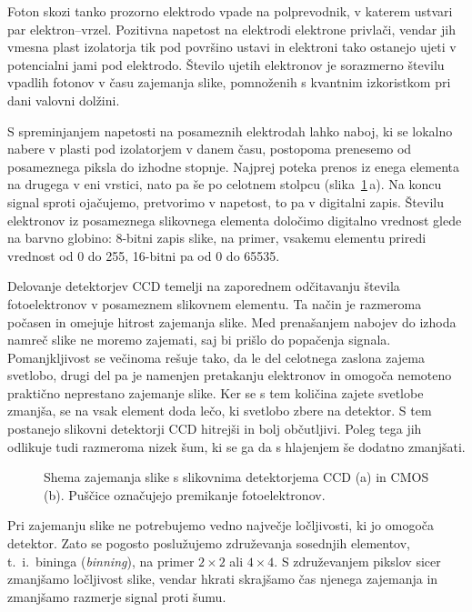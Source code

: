 Foton skozi tanko prozorno elektrodo vpade na polprevodnik, v katerem ustvari
par elektron--vrzel. Pozitivna napetost na elektrodi elektrone privlači, vendar jih 
vmesna plast izolatorja tik pod površino ustavi in elektroni tako ostanejo ujeti v potencialni jami
pod elektrodo. Število ujetih elektronov je sorazmerno številu vpadlih fotonov v času zajemanja slike, 
pomnoženih s kvantnim izkoristkom pri dani valovni dolžini. 

S spreminjanjem napetosti na posameznih elektrodah lahko naboj, ki se lokalno nabere 
v plasti pod izolatorjem v danem času, postopoma prenesemo od posameznega 
piksla do izhodne stopnje. Najprej poteka prenos iz enega elementa na drugega v eni vrstici, 
nato pa še po celotnem stolpcu (slika~\ref{11_CCD}\,a). Na koncu signal sproti ojačujemo, 
pretvorimo v napetost, to pa v digitalni zapis. Številu elektronov iz posameznega
slikovnega elementa določimo digitalno vrednost glede na barvno globino: 8-bitni zapis slike, 
na primer, vsakemu elementu priredi vrednost od 0 do 255, 16-bitni pa od 0 do 65535.

Delovanje detektorjev CCD temelji na zaporednem odčitavanju števila fotoelektronov v posameznem 
slikovnem elementu. Ta način je razmeroma počasen in omejuje hitrost zajemanja slike. Med 
prenašanjem nabojev do izhoda namreč slike ne moremo zajemati, saj bi prišlo do popačenja signala. 
Pomanjkljivost se večinoma rešuje tako, da le del celotnega zaslona zajema svetlobo, drugi del
pa je namenjen pretakanju elektronov in omogoča nemoteno praktično neprestano zajemanje slike.
Ker se s tem količina zajete svetlobe zmanjša, se na vsak element doda lečo, ki svetlobo zbere
na detektor. S tem postanejo slikovni detektorji CCD hitrejši in bolj občutljivi. Poleg
tega jih odlikuje tudi razmeroma nizek šum, ki se ga da s hlajenjem še dodatno 
zmanjšati. 

\begin{figure}[h]
\centering
\def\svgwidth{100truemm} 

\caption{Shema zajemanja slike s slikovnima detektorjema CCD (a) in  CMOS (b). Puščice označujejo premikanje
fotoelektronov.}
\label{11_CCD}
\end{figure}

\begin{remark}
Pri zajemanju slike ne potrebujemo vedno največje ločljivosti, ki jo omogoča detektor. 
Zato se pogosto poslužujemo združevanja sosednjih elementov, t.\ i.\ bininga ({\it binning}), 
na primer $2\times2$ ali $4\times4$. S združevanjem pikslov sicer zmanjšamo ločljivost slike, 
vendar hkrati skrajšamo čas njenega zajemanja in zmanjšamo razmerje signal proti šumu. 
\end{remark}

